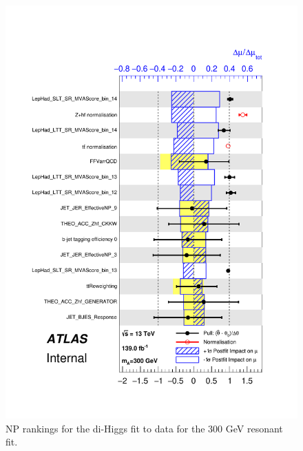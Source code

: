    \begin{figure}
   \centering
   \includegraphics[width=.8\textwidth]{figures/results/HH/LepHad/pulls_SigXsecOverSM_300.pdf}
   \caption{NP rankings for the di-Higgs \lephad fit to data for the 300 GeV resonant fit.}
   \label{fig:LepHadPostfitNPRankings2HDM300}
   \end{figure}
   
